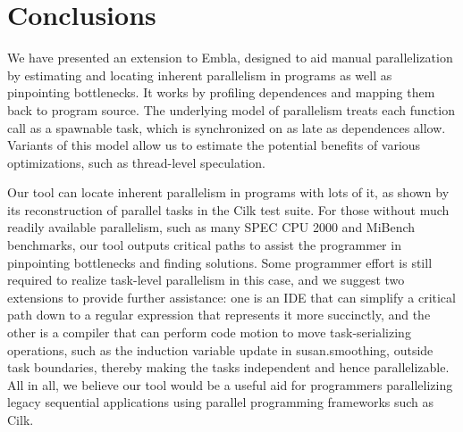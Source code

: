 \section{Conclusions}

We have presented an extension to Embla, designed to aid manual parallelization by estimating and locating inherent parallelism in programs as well as pinpointing bottlenecks.
It works by profiling dependences and mapping them back to program source.
The underlying model of parallelism treats each function call as a spawnable task, which is synchronized on as late as dependences allow.
Variants of this model allow us to estimate the potential benefits of various optimizations, such as thread-level speculation.

Our tool can locate inherent parallelism in programs with lots of it,
as shown by its reconstruction of parallel tasks in the Cilk test suite.
For those without much readily available parallelism,
such as many SPEC CPU 2000 and MiBench benchmarks,
our tool outputs critical paths to assist the programmer in pinpointing bottlenecks and finding solutions.
Some programmer effort is still required to realize task-level parallelism in this case,
and we suggest two extensions to provide further assistance:
one is an IDE that can simplify a critical path down to a regular expression that represents it more succinctly,
and the other is a compiler that can perform code motion to move task-serializing operations,
such as the induction variable update in \textsf{susan.smoothing}, outside task boundaries,
thereby making the tasks independent and hence parallelizable.
All in all, we believe our tool would be a useful aid for programmers parallelizing legacy sequential applications using parallel programming frameworks such as Cilk.
